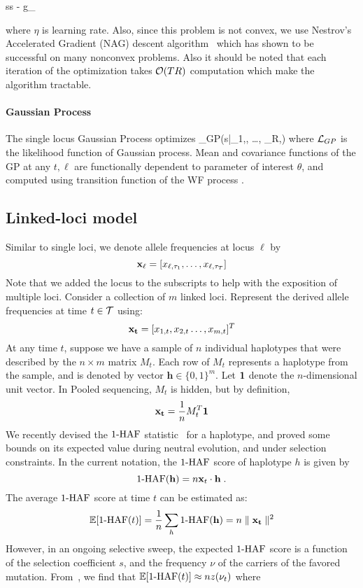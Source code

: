 \beq
s\leftarrow s - \eta  g_\ell
\eeq

where $\eta$ is learning rate. Also, since
this problem is not convex, we use Nestrov's Accelerated Gradient
(NAG) descent algorithm~\cite{sutskever2013} which has shown to be successful on
many nonconvex problems. Also it should be noted that each iteration
of the optimization takes ${\cal O}(TR)$ computation which make the
algorithm tractable.


\paragraph{Gaussian Process}
The single locus Gaussian Process \cite{} optimizes
\beq
\Lc_{GP}(s|\bfx_{1,\ell}, \dots, \bfx_{R,\ell})
\eeq
where ${\cal L}_{GP}$ is the likelihood function  of Gaussian process. Mean and covariance functions of the GP at any $t,\ell$ are functionally dependent to parameter of interest $\theta$, and computed using transition function of the WF process \cite{Terhorst15}.

\subsection*{Linked-loci model}
Similar to single loci, we denote allele frequencies at locus $\ell$ by
\[
{\bf x_{\ell}} = [x_{\ell,\tau_1},\ldots,x_{\ell,\tau_T}]
\]
Note that we added the locus to the subscripts to help with the
exposition of multiple loci. Consider a collection of $m$ linked
loci. Represent the derived allele frequencies at time $t\in {\cal T}$
using:
\[
{\bf x_t} = [x_{1,t},x_{2,t}\ldots,x_{m,t}]^T 
\]
At any time $t$, suppose we have a sample of $n$ individual haplotypes
that were described by the $n\times m$ matrix $M_t$. Each row of $M_t$
represents a haplotype from the sample, and is denoted by vector
$\mathbf{h} \in \{0,1\}^m$. Let ${\mathbf{1}}$ denote the
$n$-dimensional unit vector. In Pooled sequencing, $M_t$ is hidden,
but by definition,
\[
 \mathbf{x_t} = \frac{1}{n} M_t^T{\mathbf{1}}
\]
We recently devised the $1\text{-HAF}$ statistic~\cite{Ronen2015} for a
haplotype, and proved some bounds on its expected value during neutral
evolution, and under selection constraints. In the current notation,
the $1\text{-HAF}$ score of haplotype $h$ is given by
\begin{equation}
1\text{-HAF}(\mathbf{h})=n{\mathbf x}_t \cdot \mathbf{h}
\;.
\label{eq:1-HAF_SNPmatrix}
\end{equation}
The average $1\text{-HAF}$ score at time $t$ can be estimated as:
\begin{equation} 
\mathbb{E}[1\text{-HAF}(t)]=\frac{1}{n}\sum_h 1\text{-HAF}(\mathbf{h}) = n\parallel \mathbf{x_t}\parallel^2
\end{equation} 
However, in an ongoing selective sweep, the expected $1\text{-HAF}$ score is
a function of the selection coefficient $s$, and the frequency $\nu$
of the carriers of the favored mutation. From~\cite{Ronen2015}, we
find that $ \mathbb{E}[1\text{-HAF}(t)]\approx nz(\nu_t)$ where

